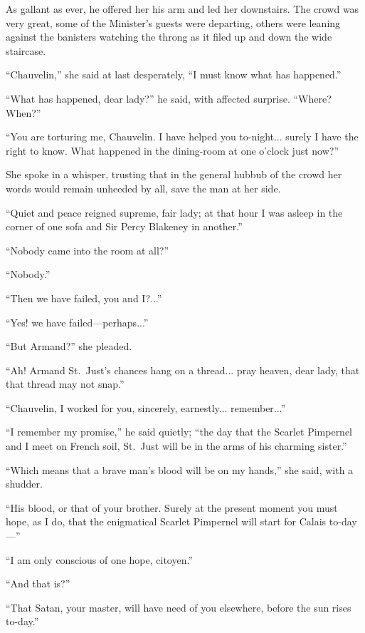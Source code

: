 \documentclass[paper=a5,BCOR=7mm,twoside,DIV=calc,12pt,usegeometry,chapterprefix,endperiod,headings=big]{scrbook}
\begin{document}
As gallant as ever, he offered her his arm and led her downstairs. The crowd was very great, some of the Minister's guests were departing, others were leaning against the banisters watching the throng as it filed up and down the wide staircase.

\enquote{Chauvelin,} she said at last desperately, \enquote{I must know what has happened.}

\enquote{What has happened, dear lady?} he said, with affected surprise. \enquote{Where? When?}

\enquote{You are torturing me, Chauvelin. I have helped you to-night... surely I have the right to know. What happened in the dining-room at one o'clock just now?}

She spoke in a whisper, trusting that in the general hubbub of the crowd her words would remain unheeded by all, save the man at her side.

\enquote{Quiet and peace reigned supreme, fair lady; at that hour I was asleep in the corner of one sofa and Sir Percy Blakeney in another.}

\enquote{Nobody came into the room at all?}

\enquote{Nobody.}

\enquote{Then we have failed, you and I?...}

\enquote{Yes! we have failed---perhaps...}

\enquote{But Armand?} she pleaded.

\enquote{Ah! Armand St.~Just's chances hang on a thread... pray heaven, dear lady, that that thread may not snap.}

\enquote{Chauvelin, I worked for you, sincerely, earnestly... remember...}

\enquote{I remember my promise,} he said quietly; \enquote{the day that the Scarlet Pimpernel and I meet on French soil, St.~Just will be in the arms of his charming sister.}

\enquote{Which means that a brave man's blood will be on my hands,} she said, with a shudder.

\enquote{His blood, or that of your brother. Surely at the present moment you must hope, as I do, that the enigmatical Scarlet Pimpernel will start for Calais to-day---}

\enquote{I am only conscious of one hope, citoyen.}

\enquote{And that is?}

\enquote{That Satan, your master, will have need of you elsewhere, before the sun rises to-day.}
\end{document}
